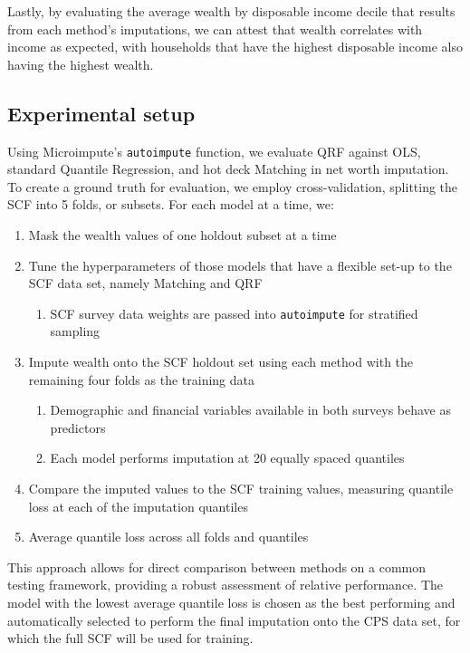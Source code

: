 Lastly, by evaluating the average wealth by disposable income decile that results from each method's imputations, we can attest that wealth correlates with income as expected, with households that have the highest disposable income also having the highest wealth. 

\subsection{Experimental setup}

Using Microimpute's \texttt{autoimpute} function, we evaluate QRF against OLS, standard Quantile Regression, and hot deck Matching in net worth imputation. To create a ground truth for evaluation, we employ cross-validation, splitting the SCF into 5 folds, or subsets. For each model at a time, we:

\begin{enumerate}
    \item Mask the wealth values of one holdout subset at a time

    \item Tune the hyperparameters of those models that have a flexible set-up to the SCF data set, namely Matching and QRF
    \begin{enumerate}
        \item SCF survey data weights are passed into \texttt{autoimpute} for stratified sampling
    \end{enumerate}

    \item Impute wealth onto the SCF holdout set using each method with the remaining four folds as the training data
    \begin{enumerate}
        \item Demographic and financial variables available in both surveys behave as predictors
        \item Each model performs imputation at 20 equally spaced quantiles
    \end{enumerate}

    \item Compare the imputed values to the SCF training values, measuring quantile loss at each of the imputation quantiles 

    \item Average quantile loss across all folds and quantiles
\end{enumerate}

This approach allows for direct comparison between methods on a common testing framework, providing a robust assessment of relative performance. The model with the lowest average quantile loss is chosen as the best performing and automatically selected to perform the final imputation onto the CPS data set, for which the full SCF will be used for training. 

